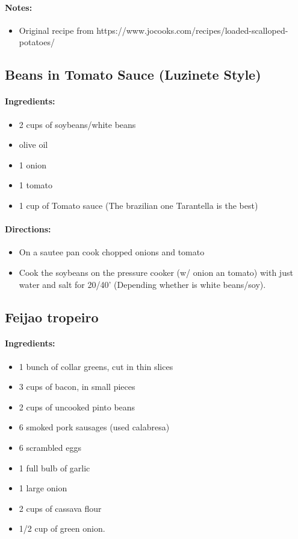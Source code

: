 \documentclass{article}
\begin{document}
\paragraph{Notes:}
\begin{itemize}
    \item Original recipe from https://www.jocooks.com/recipes/loaded-scalloped-potatoes/
\end{itemize}

\subsection{Beans in Tomato Sauce (Luzinete Style)}

\paragraph{Ingredients:}
\begin{itemize}
    \item 2 cups of soybeans/white beans
    \item olive oil
    \item 1 onion
    \item 1 tomato
    \item 1 cup of Tomato sauce (The brazilian one Tarantella is the best)
\end{itemize}

\paragraph{Directions:}
\begin{itemize}
    \item On a sautee pan cook chopped onions and tomato
    \item Cook the soybeans on the pressure cooker (w/ onion an tomato) with just water and salt for 20/40' (Depending whether is white beans/soy).
\end{itemize}

\subsection{Feijao tropeiro}

\paragraph{Ingredients:}
\begin{itemize}
    \item 1 bunch of collar greens, cut in thin slices
    \item 3 cups of bacon, in small pieces
    \item 2 cups of uncooked pinto beans
    \item 6 smoked pork sausages (used calabresa)
    \item 6 scrambled eggs
    \item 1 full bulb of garlic
    \item 1 large onion
    \item 2 cups of cassava flour
    \item 1/2 cup of green onion.
\end{itemize}
\end{document}
